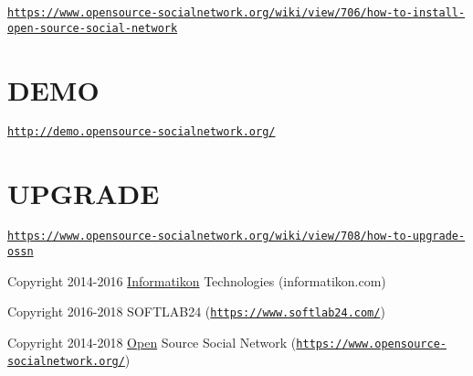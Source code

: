 \href{https://www.opensource-socialnetwork.org/wiki/view/706/how-to-install-open-source-social-network}{\tt https\+://www.\+opensource-\/socialnetwork.\+org/wiki/view/706/how-\/to-\/install-\/open-\/source-\/social-\/network}

\section*{D\+E\+MO }

\href{http://demo.opensource-socialnetwork.org/}{\tt http\+://demo.\+opensource-\/socialnetwork.\+org/}

\section*{U\+P\+G\+R\+A\+DE }

\href{https://www.opensource-socialnetwork.org/wiki/view/708/how-to-upgrade-ossn}{\tt https\+://www.\+opensource-\/socialnetwork.\+org/wiki/view/708/how-\/to-\/upgrade-\/ossn}

Copyright 2014-\/2016 \hyperlink{namespace_informatikon}{Informatikon} Technologies (informatikon.\+com)

Copyright 2016-\/2018 S\+O\+F\+T\+L\+A\+B24 (\href{https://www.softlab24.com/}{\tt https\+://www.\+softlab24.\+com/})

Copyright 2014-\/2018 \hyperlink{namespace_open}{Open} Source Social Network (\href{https://www.opensource-socialnetwork.org/}{\tt https\+://www.\+opensource-\/socialnetwork.\+org/}) 